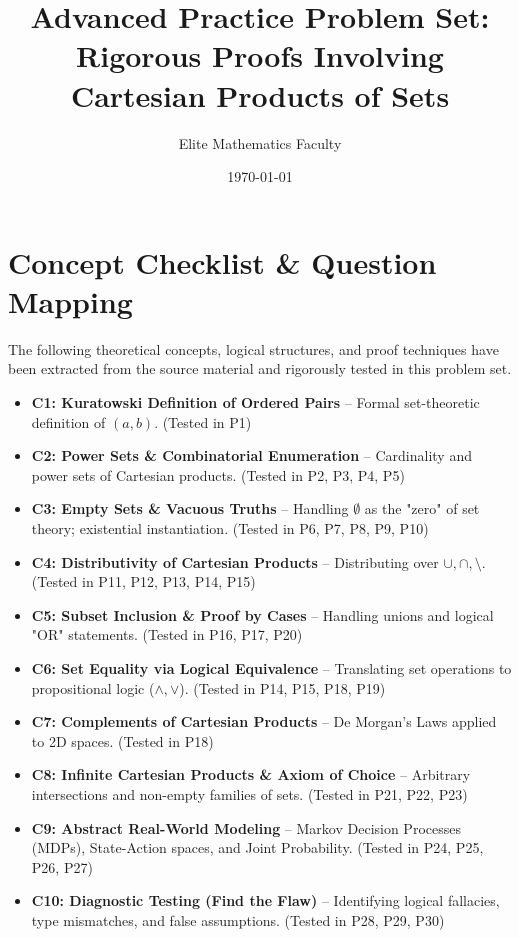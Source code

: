 \documentclass[11pt]{article}
\title{\textbf{Advanced Practice Problem Set: \\ Rigorous Proofs Involving Cartesian Products of Sets}}
\author{Elite Mathematics Faculty}
\date{\today}
\begin{document}
\maketitle

\tableofcontents
\newpage

\section{Concept Checklist \& Question Mapping}
\label{sec:checklist_start}

The following theoretical concepts, logical structures, and proof techniques have been extracted from the source material and rigorously tested in this problem set.

\begin{itemize}
    \item \textbf{C1: Kuratowski Definition of Ordered Pairs} -- Formal set-theoretic definition of $(a,b)$. (Tested in P1)
    \item \textbf{C2: Power Sets \& Combinatorial Enumeration} -- Cardinality and power sets of Cartesian products. (Tested in P2, P3, P4, P5)
    \item \textbf{C3: Empty Sets \& Vacuous Truths} -- Handling $\emptyset$ as the "zero" of set theory; existential instantiation. (Tested in P6, P7, P8, P9, P10)
    \item \textbf{C4: Distributivity of Cartesian Products} -- Distributing over $\cup, \cap, \setminus$. (Tested in P11, P12, P13, P14, P15)
    \item \textbf{C5: Subset Inclusion \& Proof by Cases} -- Handling unions and logical "OR" statements. (Tested in P16, P17, P20)
    \item \textbf{C6: Set Equality via Logical Equivalence} -- Translating set operations to propositional logic ($\land, \lor$). (Tested in P14, P15, P18, P19)
    \item \textbf{C7: Complements of Cartesian Products} -- De Morgan's Laws applied to 2D spaces. (Tested in P18)
    \item \textbf{C8: Infinite Cartesian Products \& Axiom of Choice} -- Arbitrary intersections and non-empty families of sets. (Tested in P21, P22, P23)
    \item \textbf{C9: Abstract Real-World Modeling} -- Markov Decision Processes (MDPs), State-Action spaces, and Joint Probability. (Tested in P24, P25, P26, P27)
    \item \textbf{C10: Diagnostic Testing (Find the Flaw)} -- Identifying logical fallacies, type mismatches, and false assumptions. (Tested in P28, P29, P30)
\end{itemize}
\end{document}
